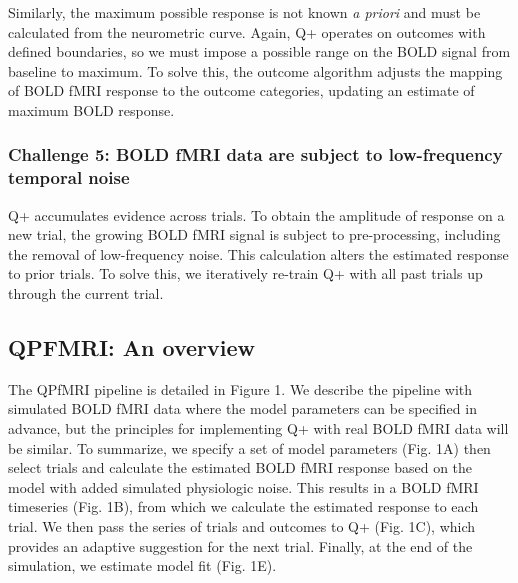\documentclass[
  english,
  man,floatsintext]{apa6}
\begin{document}
Similarly, the maximum possible response is not known \emph{a priori} and must be calculated from the neurometric curve. Again, Q+ operates on outcomes with defined boundaries, so we must impose a possible range on the BOLD signal from baseline to maximum. To solve this, the outcome algorithm adjusts the mapping of BOLD fMRI response to the outcome categories, updating an estimate of maximum BOLD response.

\hypertarget{challenge-5-bold-fmri-data-are-subject-to-low-frequency-temporal-noise}{%
\subsubsection{Challenge 5: BOLD fMRI data are subject to low-frequency temporal noise}\label{challenge-5-bold-fmri-data-are-subject-to-low-frequency-temporal-noise}}

Q+ accumulates evidence across trials. To obtain the amplitude of response on a new trial, the growing BOLD fMRI signal is subject to pre-processing, including the removal of low-frequency noise. This calculation alters the estimated response to prior trials. To solve this, we iteratively re-train Q+ with all past trials up through the current trial.

\hypertarget{qpfmri-an-overview}{%
\subsection{QPFMRI: An overview}\label{qpfmri-an-overview}}

The QPfMRI pipeline is detailed in Figure 1. We describe the pipeline with simulated BOLD fMRI data where the model parameters can be specified in advance, but the principles for implementing Q+ with real BOLD fMRI data will be similar. To summarize, we specify a set of model parameters (Fig. 1A) then select trials and calculate the estimated BOLD fMRI response based on the model with added simulated physiologic noise. This results in a BOLD fMRI timeseries (Fig. 1B), from which we calculate the estimated response to each trial. We then pass the series of trials and outcomes to Q+ (Fig. 1C), which provides an adaptive suggestion for the next trial. Finally, at the end of the simulation, we estimate model fit (Fig. 1E).
\end{document}
